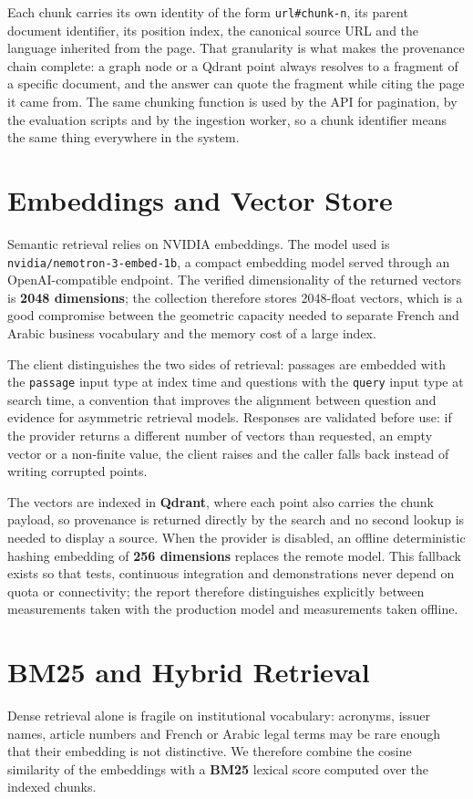 Each chunk carries its own identity of the form \texttt{url\#chunk-n}, its parent document identifier, its position index, the canonical source URL and the language inherited from the page. That granularity is what makes the provenance chain complete: a graph node or a Qdrant point always resolves to a fragment of a specific document, and the answer can quote the fragment while citing the page it came from. The same chunking function is used by the API for pagination, by the evaluation scripts and by the ingestion worker, so a chunk identifier means the same thing everywhere in the system.

\section{Embeddings and Vector Store}
\label{sec:embeddings}
Semantic retrieval relies on NVIDIA embeddings. The model used is \texttt{nvidia/}\allowbreak\texttt{nemotron-3-embed-1b}, a compact embedding model served through an OpenAI-compatible endpoint. The verified dimensionality of the returned vectors is \textbf{2048 dimensions}; the collection therefore stores 2048-float vectors, which is a good compromise between the geometric capacity needed to separate French and Arabic business vocabulary and the memory cost of a large index.

The client distinguishes the two sides of retrieval: passages are embedded with the \texttt{passage} input type at index time and questions with the \texttt{query} input type at search time, a convention that improves the alignment between question and evidence for asymmetric retrieval models. Responses are validated before use: if the provider returns a different number of vectors than requested, an empty vector or a non-finite value, the client raises and the caller falls back instead of writing corrupted points.

The vectors are indexed in \textbf{Qdrant}, where each point also carries the chunk payload, so provenance is returned directly by the search and no second lookup is needed to display a source. When the provider is disabled, an offline deterministic hashing embedding of \textbf{256 dimensions} replaces the remote model. This fallback exists so that tests, continuous integration and demonstrations never depend on quota or connectivity; the report therefore distinguishes explicitly between measurements taken with the production model and measurements taken offline.

\section{BM25 and Hybrid Retrieval}
\label{sec:bm25}
Dense retrieval alone is fragile on institutional vocabulary: acronyms, issuer names, article numbers and French or Arabic legal terms may be rare enough that their embedding is not distinctive. We therefore combine the cosine similarity of the embeddings with a \textbf{BM25} lexical score computed over the indexed chunks.

